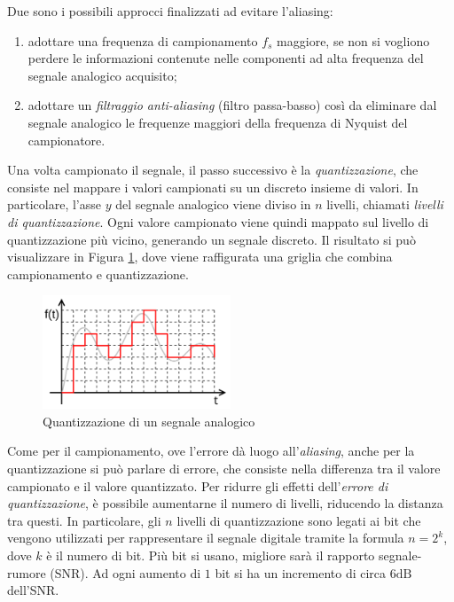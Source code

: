 \documentclass[a4paper,12pt]{report}  %
\begin{document}
Due sono i possibili approcci finalizzati ad evitare l'aliasing:
\begin{enumerate}
    \item adottare una frequenza di campionamento $f_s$ maggiore, se non si vogliono perdere le informazioni contenute nelle componenti ad alta frequenza del segnale analogico acquisito;
    \item adottare un \textit{filtraggio anti-aliasing} (filtro passa-basso) così da eliminare dal segnale analogico le frequenze maggiori della frequenza di Nyquist del campionatore.
\end{enumerate}

Una volta campionato il segnale, il passo successivo è la \textit{quantizzazione}, che consiste nel mappare i valori campionati su un discreto insieme di valori.
In particolare, l'asse $y$ del segnale analogico viene diviso in $n$ livelli, chiamati \textit{livelli di quantizzazione}.
Ogni valore campionato viene quindi mappato sul livello di quantizzazione più vicino, generando un segnale discreto.
Il risultato si può visualizzare in Figura \ref{fig:quantization}, dove viene raffigurata una griglia che combina campionamento e quantizzazione.

\begin{figure}[h]
    \centering
    \includegraphics[width=0.5\textwidth]{imgs/Quantization.png}
    \caption{Quantizzazione di un segnale analogico}
    \label{fig:quantization}
\end{figure}

Come per il campionamento, ove l'errore dà luogo all'\textit{aliasing}, anche per la quantizzazione si può parlare di errore, che consiste nella differenza tra il valore campionato e il valore quantizzato.
Per ridurre gli effetti dell'\textit{errore di quantizzazione}, è possibile aumentarne il numero di livelli, riducendo la distanza tra questi.
In particolare, gli $n$ livelli di quantizzazione sono legati ai bit che vengono utilizzati per rappresentare il segnale digitale tramite la formula $n = 2^k$, dove $k$ è il numero di bit.
Più bit si usano, migliore sarà il rapporto segnale-rumore (SNR).
Ad ogni aumento di $1$ bit si ha un incremento di circa $6 \text{dB}$ dell'SNR.
\end{document}
